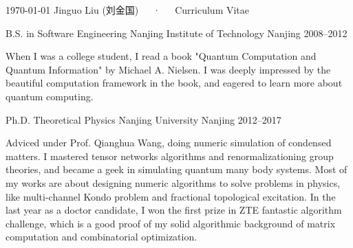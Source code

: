 \documentclass[11pt, a4paper]{awesome-cv}
\begin{document}
\makecvheader

\makecvfooter
  {\today}
  {Jinguo Liu (刘金国)~~~·~~~Curriculum Vitae}
  {\thepage}


\begin{cventries}
  \cventry
    {B.S. in Software Engineering}
    {Nanjing Institute of Technology}
    {Nanjing}
    {2008--2012}
    {\begin{cvitems}
     When I was a college student, I read a book "Quantum Computation and Quantum Information" by Michael A. Nielsen.
        I was deeply impressed by the beautiful computation framework in the book, and eagered to learn more about quantum computing.
    \end{cvitems}}
  \cventry
    {Ph.D. Theoretical Physics}
    {Nanjing University}
    {Nanjing}
    {2012--2017}
    {\begin{cvitems}
    Adviced under Prof. Qianghua Wang, doing numeric simulation of condensed matters.
    I mastered tensor networks algorithms and renormalizationing group theories, and became a geek in simulating quantum many body systems. Most of my works are about designing numeric algorithms to solve problems in physics, like multi-channel Kondo problem and fractional topological excitation.
    In the last year as a doctor candidate, I won the first prize in ZTE fantastic algorithm challenge, which is a good proof of my solid algorithmic background of matrix computation and combinatorial optimization.
    \end{cvitems}}
\end{cventries}
\end{document}

